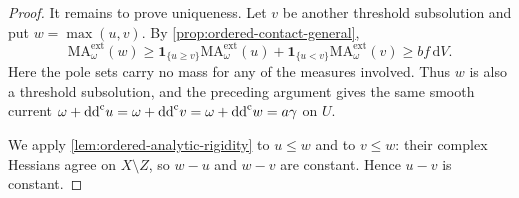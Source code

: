 \begin{proof}
It remains to prove uniqueness. Let $v$ be another threshold subsolution and put $w=\max(u,v)$. By \cref{prop:ordered-contact-general},
\[
 \mathrm{MA}^{\mathrm{ext}}_\omega(w)\geq
 \mathbf1_{\{u\geq v\}}\mathrm{MA}^{\mathrm{ext}}_\omega(u)
 +\mathbf1_{\{u<v\}}\mathrm{MA}^{\mathrm{ext}}_\omega(v)
 \geq bf\,\mathrm{d}V.
\]
Here the pole sets carry no mass for any of the measures involved. Thus $w$ is also a threshold subsolution, and the preceding argument gives the same smooth current $\omega+\mathrm{dd}^{\mathrm{c}} u=\omega+\mathrm{dd}^{\mathrm{c}} v=\omega+\mathrm{dd}^{\mathrm{c}} w=a\gamma$ on $U$.

We apply \cref{lem:ordered-analytic-rigidity} to $u\leq w$ and to $v\leq w$: their complex Hessians agree on $X\setminus Z$, so $w-u$ and $w-v$ are constant. Hence $u-v$ is constant.
\end{proof}
